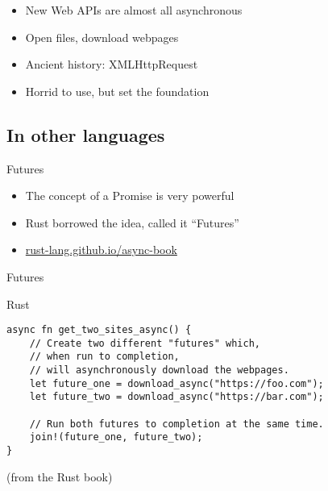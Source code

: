\documentclass{beamer}
\begin{document}
\begin{frame}
	\begin{itemize}
		\item New Web APIs are almost all asynchronous
		\item Open files, download webpages
		\item Ancient history: XMLHttpRequest
		\item Horrid to use, but set the foundation
	\end{itemize}
\end{frame}

\subsection{In other languages}

\begin{frame}{Futures}
	\begin{itemize}
		\item The concept of a Promise is very powerful
		\item Rust borrowed the idea, called it \enquote{Futures}
		\item
			\href{https://rust-lang.github.io/async-book/}{rust-lang.github.io/async-book}
	\end{itemize}
\end{frame}


\begin{frame}[fragile]{Futures}
\begin{block}{Rust}
\begin{verbatim}
async fn get_two_sites_async() {
    // Create two different "futures" which,
	// when run to completion,
    // will asynchronously download the webpages.
    let future_one = download_async("https://foo.com");
    let future_two = download_async("https://bar.com");

    // Run both futures to completion at the same time.
    join!(future_one, future_two);
}
\end{verbatim}
\end{block}

(from the Rust book)
	
\end{frame}
\end{document}

